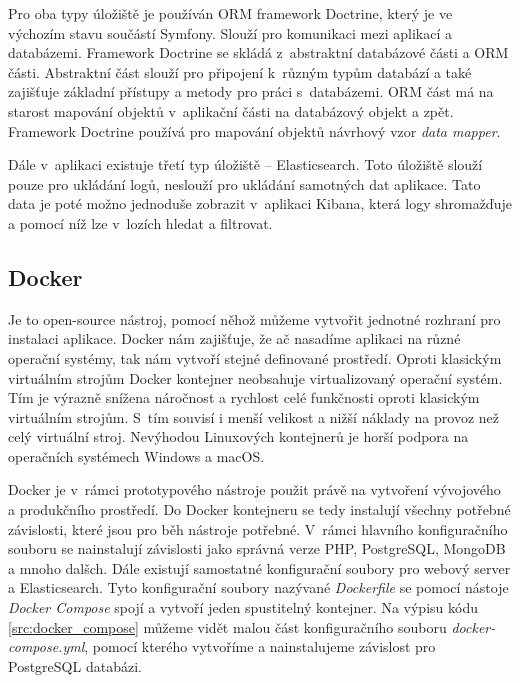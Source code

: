 \documentclass[czech,master]{diploma}
\begin{document}
Pro oba typy úložiště je používán ORM framework Doctrine, který je ve výchozím stavu součástí Symfony. Slouží pro komunikaci mezi aplikací a databázemi. Framework Doctrine se skládá z~abstraktní databázové části  a ORM části. Abstraktní část slouží pro připojení k~různým typům databází a také zajišťuje základní přístupy a metody pro práci s~databázemi. ORM část má na starost mapování objektů v~aplikační části na databázový objekt a zpět. Framework Doctrine používá pro mapování objektů návrhový vzor \textit{data mapper}.


Dále v~aplikaci existuje třetí typ úložiště -- Elasticsearch. Toto úložiště slouží pouze pro ukládání logů, neslouží pro ukládání samotných dat aplikace. Tato data je poté možno jednoduše zobrazit v~aplikaci Kibana, která logy shromažďuje a pomocí níž lze v~lozích hledat a filtrovat.

\subsection{Docker}
\label{sec:docker}
Je to open-source nástroj, pomocí něhož můžeme vytvořit jednotné rozhraní pro instalaci aplikace. Docker nám zajišťuje, že ač nasadíme aplikaci na různé operační systémy, tak nám vytvoří stejné definované prostředí. Oproti klasickým virtuálním strojům Docker kontejner neobsahuje virtualizovaný operační systém. Tím je výrazně snížena náročnost a rychlost celé funkčnosti oproti klasickým virtuálním strojům. S~tím souvisí i menší velikost a nižší náklady na provoz než celý virtuální stroj. Nevýhodou Linuxových kontejnerů je horší podpora na operačních systémech Windows a macOS.

Docker je v~rámci prototypového nástroje použit právě na vytvoření vývojového a produkčního prostředí. Do Docker kontejneru se tedy instalují všechny potřebné závislosti, které jsou pro běh nástroje potřebné. V~rámci hlavního konfiguračního souboru se nainstalují závislosti jako správná verze PHP, PostgreSQL, MongoDB a mnoho dalšch. Dále existují samostatné konfigurační soubory pro webový server a Elasticsearch. Tyto konfigurační soubory nazývané \textit{Dockerfile} se pomocí nástoje \textit{Docker Compose} spojí a vytvoří jeden spustitelný kontejner. Na výpisu kódu \ref{src:docker_compose} můžeme vidět malou část konfiguračního souboru \textit{docker-compose.yml}, pomocí kterého vytvoříme a nainstalujeme závislost pro PostgreSQL databázi.


\end{document}
